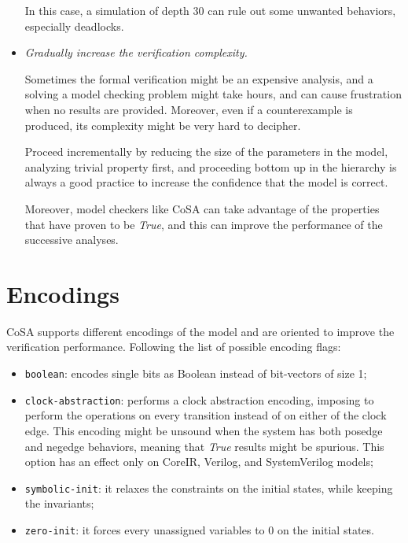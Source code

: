 \documentclass{article}
\theoremstyle{definition}
\begin{document}
\begin{itemize}
  In this case, a simulation of depth $30$ can rule out some unwanted
  behaviors, especially deadlocks.

  
\item \textit{Gradually increase the verification complexity.}

  Sometimes the formal verification might be an expensive analysis,
  and a solving a model checking problem might take hours, and can
  cause frustration when no results are provided. Moreover, even if a
  counterexample is produced, its complexity might be very hard to
  decipher.

  Proceed incrementally by reducing the size of the parameters in the
  model, analyzing trivial property first, and proceeding bottom up in
  the hierarchy is always a good practice to increase the confidence
  that the model is correct.

  Moreover, model checkers like CoSA can take advantage of the
  properties that have proven to be \emph{True}, and this can improve
  the performance of the successive analyses.
\end{itemize}
  


\section{Encodings}
\label{sec:encodings}

CoSA supports different encodings of the model and are oriented to
improve the verification performance. Following the list of possible
encoding flags:

\begin{itemize}
\item \texttt{boolean}: encodes single bits as Boolean instead of
  bit-vectors of size 1;
\item \texttt{clock-abstraction}: performs a clock abstraction
  encoding, imposing to perform the operations on every transition
  instead of on either of the clock edge. This encoding might be
  unsound when the system has both posedge and negedge behaviors,
  meaning that \emph{True} results might be spurious. This option has
  an effect only on CoreIR, Verilog, and SystemVerilog models;
\item \texttt{symbolic-init}: it relaxes the constraints on the
  initial states, while keeping the invariants;
\item \texttt{zero-init}: it forces every unassigned variables to 0 on
  the initial states.
\end{itemize}
\end{document}
